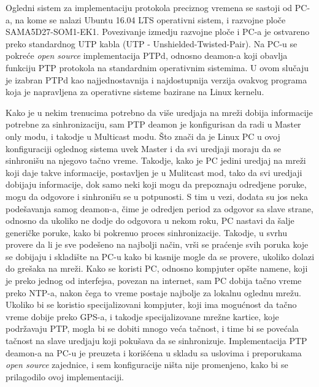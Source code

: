 \documentclass[a4paper,12pt, master]{etf}
\begin{document}
    Ogledni sistem za implementaciju protokola preciznog vremena se sastoji
	od PC-a, na kome se nalazi Ubuntu 16.04 LTS operativni sistem, i razvojne
	plo\v{c}e SAMA5D27-SOM1-EK1. Povezivanje izmedju razvojne plo\v{c}e i PC-a
	je ostvareno preko standardnog UTP kabla (UTP - Unshielded-Twisted-Pair).
    Na PC-u se pokre\'{c}e \textit{open source} implementacija PTPd, odnosno
    deamon-a koji obavlja funkciju PTP protokola na standardnim operativnim
    sistemima. U ovom slu\v{c}aju je izabran PTPd kao najjednostavnija i
    najdostupnija verzija ovakvog programa koja je napravljena za operativne
    sisteme bazirane na Linux kernelu.

	Kako je u nekim trenucima potrebno da vi\v{s}e uredjaja na mre\v{z}i dobija
	informacije potrebne za sinhronizaciju, sam PTP deamon je konfigurisan da
	radi u Master only modu, i takodje u Multicast modu. \v{S}to zna\v{c}i da
	je Linux PC u ovoj konfiguraciji oglednog sistema uvek Master i da svi
	uredjaji moraju da se sinhroni\v{s}u na njegovo ta\v{c}no vreme. Takodje,
	kako je PC jedini uredjaj na mre\v{z}i koji daje takve informacije,
	postavljen je u Mulitcast mod, tako da svi uredjaji dobijaju informacije,
	dok samo neki koji mogu da prepoznaju odredjene poruke, mogu da odgovore i
	sinhroni\v{s}u se u potpunosti. S tim u vezi, dodata su jos neka
	pode\v{s}avanja samog deamon-a, \v{c}ime je odredjen period za odgovor sa
	slave strane, odnosno da ukoliko ne dodje do odgovora u nekom roku, PC
	nastavi da \v{s}alje generi\v{c}ke poruke, kako bi pokrenuo proces
	sinhronizacije. Takodje, u svrhu provere da li je sve pode\v{s}eno na
	najbolji na\v{c}in, vr\v{s}i se pra\'{c}enje svih poruka koje se dobijaju i
	skladi\v{s}te na PC-u kako bi kasnije mogle da se provere, ukoliko dolazi
	do gre\v{s}aka na mre\v{z}i. Kako se koristi PC, odnosno kompjuter
	op\v{s}te namene, koji je preko jednog od interfejsa, povezan na internet,
	sam PC dobija ta\v{c}no vreme preko NTP-a, nakon \v{c}ega to vreme postaje
	najbolje za lokalnu oglednu mre\v{z}u. Ukoliko bi se koristio
	specijalizovani kompjuter, koji ima mogu\'{c}nost da ta\v{c}no vreme dobije
	preko GPS-a, i takodje specijalizovane mre\v{z}ne kartice, koje
	podr\v{z}avaju PTP, mogla bi se dobiti mnogo ve\'{c}a ta\v{c}nost, i time
	bi se pove\'{c}ala ta\v{c}nost na slave uredjaju koji poku\v{s}ava da se
	sinhronizuje. Implementacija PTP deamon-a na PC-u je preuzeta i
    kori\v{s}\'{c}ena u skladu sa uslovima i preporukama \textit{open source}
    zajednice, i sem konfiguracije ni\v{s}ta nije promenjeno, kako bi se
    prilagodilo ovoj implementaciji.
\end{document}
